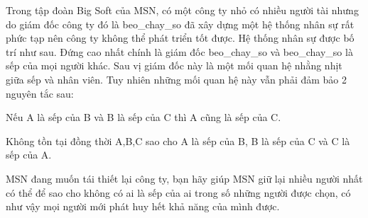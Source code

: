 Trong tập đoàn Big Soft của MSN, có một công ty nhỏ có nhiều người tài nhưng do giám đốc công ty đó là beo\_chay\_so đã xây dựng một hệ thống nhân sự rất phức tạp nên công ty không thể phát triển tốt được. Hệ thống nhân sự được bố trí như sau. Đứng cao nhất chính là giám đốc beo\_chay\_so và beo\_chay\_so là sếp của mọi người khác. Sau vị giám đốc này là một mối quan hệ nhằng nhịt giữa sếp và nhân viên. Tuy nhiên những mối quan hệ này vẫn phải đảm bảo 2 nguyên tắc sau:  

   Nếu A là sếp của B và B là sếp của C thì A cũng là sếp của C.  

   Không tồn tại đồng thời A,B,C sao cho A là sếp của B, B là sếp của C và C là sếp của A.  

   MSN đang muốn tái thiết lại công ty, bạn hãy giúp MSN giữ lại nhiều người nhất có thể để sao cho không có ai là sếp của ai trong số những người được chọn, có như vậy mọi người mới phát huy hết khả năng của mình được.